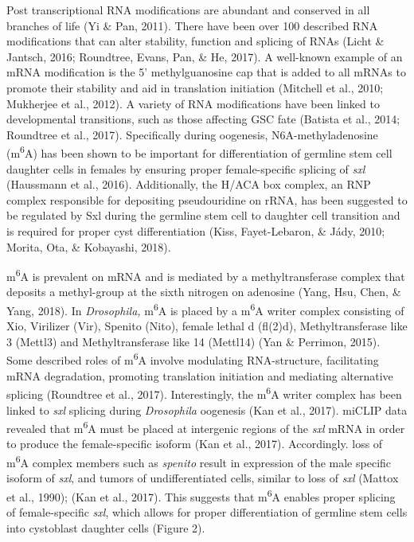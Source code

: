 \documentclass[12pt,twoside]{reedthesis}
\begin{document}
Post transcriptional RNA modifications are abundant and conserved in all
branches of life (Yi \& Pan, 2011). There have been over 100 described RNA
modifications that can alter stability, function and splicing of RNAs
(Licht \& Jantsch, 2016; Roundtree, Evans, Pan, \& He, 2017). A well-known example of an mRNA
modification is the 5' methylguanosine cap that is added to all mRNAs to
promote their stability and aid in translation initiation
(Mitchell et al., 2010; Mukherjee et al., 2012). A variety of RNA modifications have
been linked to developmental transitions, such as those affecting GSC
fate (Batista et al., 2014; Roundtree et al., 2017). Specifically during oogenesis,
N6A-methyladenosine (m\textsuperscript{6}A) has been shown to be important for
differentiation of germline stem cell daughter cells in females by
ensuring proper female-specific splicing of \emph{sxl} (Haussmann et al., 2016).
Additionally, the H/ACA box complex, an RNP complex responsible for
depositing pseudouridine on rRNA, has been suggested to be regulated by
Sxl during the germline stem cell to daughter cell transition and is
required for proper cyst differentiation (Kiss, Fayet-Lebaron, \& Jády, 2010; Morita, Ota, \& Kobayashi, 2018).

m\textsuperscript{6}A is prevalent on mRNA and is mediated by a methyltransferase
complex that deposits a methyl-group at the sixth nitrogen on adenosine
(Yang, Hsu, Chen, \& Yang, 2018). In \emph{Drosophila,} m\textsuperscript{6}A is placed by a m\textsuperscript{6}A writer
complex consisting of Xio, Virilizer (Vir), Spenito (Nito), female
lethal d (fl(2)d), Methyltransferase like 3 (Mettl3) and
Methyltransferase like 14 (Mettl14) (Yan \& Perrimon, 2015). Some described roles
of m\textsuperscript{6}A involve modulating RNA-structure, facilitating mRNA
degradation, promoting translation initiation and mediating alternative
splicing (Roundtree et al., 2017). Interestingly, the m\textsuperscript{6}A writer complex
has been linked to \emph{sxl} splicing during \emph{Drosophila} oogenesis
(Kan et al., 2017). miCLIP data revealed that m\textsuperscript{6}A must be placed at
intergenic regions of the \emph{sxl} mRNA in order to produce the
female-specific isoform (Kan et al., 2017). Accordingly. loss of m\textsuperscript{6}A
complex members such as \emph{spenito} result in expression of the male
specific isoform of \emph{sxl}, and tumors of undifferentiated cells, similar
to loss of \emph{sxl} (Mattox et al., 1990); (Kan et al., 2017). This suggests that
m\textsuperscript{6}A enables proper splicing of female-specific \emph{sxl}, which allows for
proper differentiation of germline stem cells into cystoblast daughter
cells (Figure 2).
\end{document}
